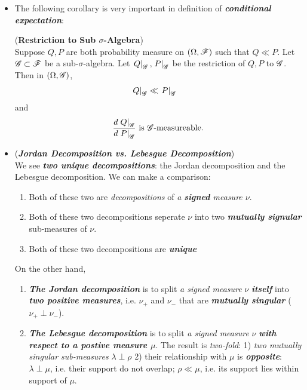 \documentclass[11pt]{article}
\begin{document}
\begin{itemize}
 
\item The following corollary is very important in definition of \emph{\textbf{conditional expectation}}: 
\begin{corollary} (\textbf{Restriction to Sub $\sigma$-Algebra}) \citep{resnick2013probability} \\
 Suppose $Q, P$ are both probability measure on $(\Omega, {\mathscr F})$ such that $Q\ll P$. Let ${\mathscr G} \subset {\mathscr F}$ be a sub-$\sigma$-algebra. Let $\left.{Q}\right\vert_{{\mathscr G}}, \left.{P}\right\vert_{{\mathscr G}}$ be the restriction of $Q,P $ to ${\mathscr G}$. Then in $(\Omega, {\mathscr G})$, 
\begin{align*}
\left.{Q}\right\vert_{{\mathscr G}}&\ll \left.{P}\right\vert_{{\mathscr G}}
\end{align*} 
and 
\begin{align*}
\frac{d\left.{Q}\right\vert_{{\mathscr G}}}{d\left.{P}\right\vert_{{\mathscr G}}} \text{ is }{\mathscr G}\text{-measureable.}
\end{align*}
\end{corollary}

\item \begin{remark} (\emph{\textbf{Jordan Decomposition vs. Lebesgue Decomposition}})\\
We see \emph{\textbf{two unique decompositions}}: the Jordan decomposition and the Lebesgue decomposition. We can make a comparison: 
\begin{enumerate}
\item Both of these two are \emph{decompositions} of \emph{a \textbf{signed} measure $\nu$}.
\item Both of these two decompositions seperate $\nu$ into two  \emph{\textbf{mutually signular}} sub-measures of $\nu$.
\item Both of these two decompositions are \emph{\textbf{unique}}
\end{enumerate}
On the other hand,
\begin{enumerate}
\item \emph{\textbf{The Jordan decomposition}} is to split \emph{a signed measure} $\nu$ \emph{\textbf{itself}} into \emph{\textbf{two positive measures}}, i.e. $\nu_{+}$ and $\nu_{-}$ that are \emph{\textbf{mutually singular}} ($\nu_{+} \perp \nu_{-}$). 

\item \emph{\textbf{The Lebesgue decomposition}} is to split \emph{a signed measure} $\nu$ \emph{\textbf{with respect to a postive measure $\mu$}}. The result is \emph{two-fold}: 1) \emph{two mutually singular sub-measures} $\lambda \perp \rho$ 2) their relationship with $\mu$ is \emph{\textbf{opposite}}:  $\lambda \perp \mu$, i.e. their support do not overlap; $\rho \ll \mu$, i.e. its support lies within support of $\mu$.


\end{enumerate}
\end{remark}
\end{itemize}
\end{document}
